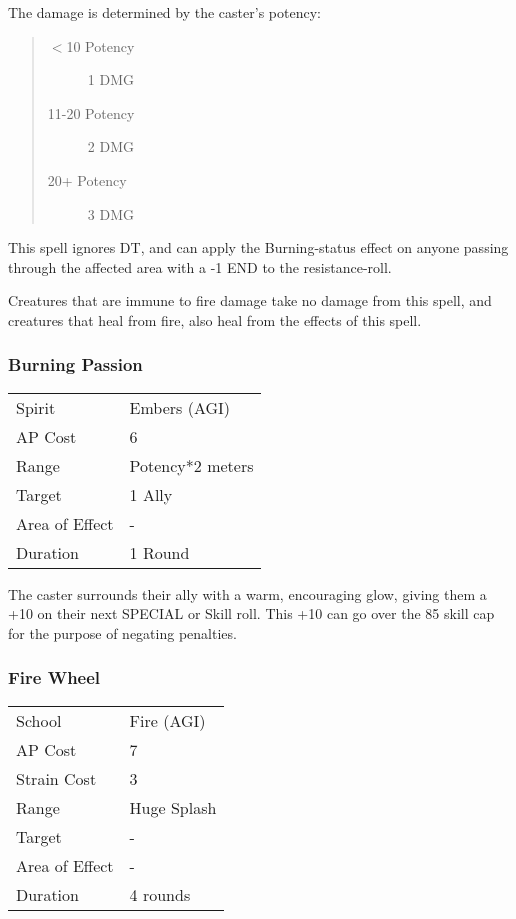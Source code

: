 \documentclass[11pt,a4paper,twocolumn]{book}
\begin{document}
The damage is determined by the caster's potency:
\begin{quote}
	\begin{description}
		\item[$<$10 Potency]	1 DMG
		\item[11-20 Potency]	2 DMG
		\item[20+ Potency]		3 DMG
	\end{description}	
\end{quote}

This spell ignores DT, and can apply the Burning-status effect on anyone passing through the affected area with a -1 END to the resistance-roll.

Creatures that are immune to fire damage take no damage from this spell, and creatures that heal from fire, also heal from the effects of this spell.


\subsubsection*{Burning Passion}
{
	\begin{tabu} to 70mm{| X[l,4] | X[l,7] |}
		\hline
		Spirit         & Embers (AGI)          \\
		AP Cost        & 6                     \\
		Range          & Potency*2 meters \\
		Target         & 1 Ally                \\
		Area of Effect & -                     \\
		Duration       & 1 Round               \\ \hline
	\end{tabu}
	
}

\medskip

The caster surrounds their ally with a warm, encouraging glow, giving them a +10 on their next SPECIAL or Skill roll. This +10 can go over the 85 skill cap for the purpose of negating penalties.

\subsubsection*{Fire Wheel}
{
	\begin{tabu} to 75mm{| X[l,4] | X[l,7] |}
		\hline
		School 			&  Fire (AGI)			\\
		AP Cost	      	&  7					\\
		Strain Cost     &  3					\\
		Range     		&  Huge Splash		\\
		Target      	&  -					\\
		Area of Effect  &  -	 				\\
		Duration     	&  4 rounds		\\ \hline
	\end{tabu}
	
}
\end{document}

